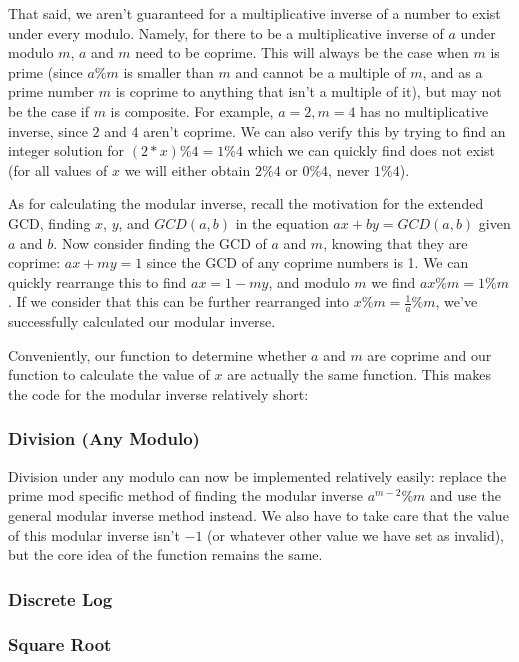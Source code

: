 That said, we aren't guaranteed for a multiplicative inverse of a number to exist under every modulo. Namely, for there to be a multiplicative inverse of $a$ under modulo $m$, $a$ and $m$ need to be coprime. This will always be the case when $m$ is prime (since $a \% m$ is smaller than $m$ and cannot be a multiple of $m$, and as a prime number $m$ is coprime to anything that isn't a multiple of it), but may not be the case if $m$ is composite. For example, $a = 2, m = 4$ has no multiplicative inverse, since $2$ and $4$ aren't coprime. We can also verify this by trying to find an integer solution for $(2 * x) \% 4 = 1 \% 4$ which we can quickly find does not exist (for all values of $x$ we will either obtain $2 \% 4$ or $0 \% 4$, never $1 \% 4$).

As for calculating the modular inverse, recall the motivation for the extended GCD, finding $x$, $y$, and $GCD(a,b)$ in the equation $ax + by = GCD(a,b)$ given $a$ and $b$. Now consider finding the GCD of $a$ and $m$, knowing that they are coprime: $ax + my = 1$ since the GCD of any coprime numbers is 1. We can quickly rearrange this to find $ax = 1 - my$, and modulo $m$ we find $ax \% m = 1 \% m$. If we consider that this can be further rearranged into $x \% m = \frac{1}{a} \% m$, we've successfully calculated our modular inverse.

Conveniently, our function to determine whether $a$ and $m$ are coprime and our function to calculate the value of $x$ are actually the same function. This makes the code for the modular inverse relatively short:


\subsubsection{Division (Any Modulo)}

Division under any modulo can now be implemented relatively easily: replace the prime mod specific method of finding the modular inverse $a^{m-2}\%m$ and use the general modular inverse method instead. We also have to take care that the value of this modular inverse isn't $-1$ (or whatever other value we have set as invalid), but the core idea of the function remains the same.

\subsubsection{Discrete Log}

\subsubsection{Square Root}
